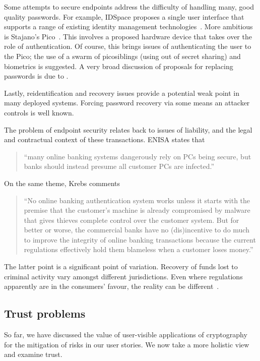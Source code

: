 \documentclass{article}
\def\citeN{\citet}
\def\cite{\citep}
\begin{document}
Some attempts to secure endpoints address the difficulty of handling many, good quality passwords.  
For example, IDSpace proposes a single user interface that supports a range of existing identity management technologies~\cite{Alsinani+12}.
More ambitious is Stajano's Pico~\cite{Stajano11}.  This involves a proposed hardware device that takes over the role of authentication.  Of course, this brings issues of authenticating the user to the Pico; the use of a swarm of picosiblings (using  out of  secret sharing) and biometrics is suggested.  A very broad discussion of proposals for replacing passwords is due to \citeN{Bonneau+12}.

Lastly, reidentification and recovery issues provide a potential weak point in many deployed systems.  Forcing password recovery via some means an attacker controls is well known.

The problem of endpoint security relates back to issues of liability, and the legal and contractual context of these transactions.
ENISA states that
\begin{quote}
  ``many online banking systems dangerously rely on PCs being secure,
  but banks should instead presume all customer PCs are
  infected.''~\cite{mENISA}
\end{quote}
On the same theme, Krebs comments
\begin{quote}
  ``No online banking authentication system works unless it starts
  with the premise that the customer’s machine is already compromised
  by malware that gives thieves complete control over the customer
  system. But for better or worse, the commercial banks have no
  (dis)incentive to do much to improve the integrity of online banking
  transactions because the current regulations effectively hold them
  blameless when a customer loses money.''~\cite{mKrebs}
\end{quote}
The latter point is a significant point of variation.  Recovery of funds lost to criminal activity vary amongst different jurisdictions.  Even where regulations apparently are in the consumers' favour, the reality can be different~\cite{mFIPR,mMason2}.


\subsection{Trust problems}\label{sec:trustRoots}

So far, we have discussed the value of user-visible applications of cryptography for
the mitigation of risks in our user stories.  We now take a more
holistic view and examine trust.
\end{document}
